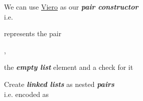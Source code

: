\hSep

\begin{enumerate}
    \vItem We can use \ul{Viero} as our \textbf{\textit{pair constructor}} \\
    i.e. 
    \begin{itemize}
        \vItem
        represents the pair 

        \vItem
        ,
        \vItem
    \end{itemize}

    \vItem
    the \textbf{\textit{empty list}} element
     and
    \vItem
    a check for it

    \vItem Create \textbf{\textit{linked lists}} as nested
    \textbf{\textit{pairs}} \\
    i.e. \iMbox{[x_{1}, \dots, x_{n}]} encoded as
\end{enumerate}

\hSep
